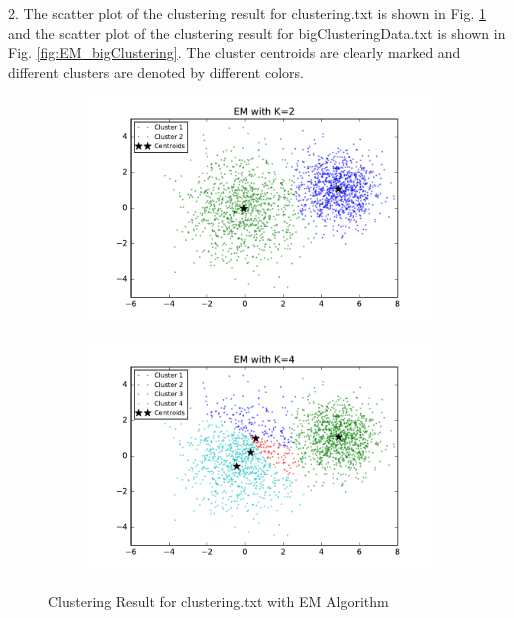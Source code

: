 \begin{description}
\begin{description}
\item{2.} The scatter plot of the clustering result for clustering.txt is shown in Fig. \ref{fig:EM_clustering} and the scatter plot of the clustering result for bigClusteringData.txt is shown in Fig. \ref{fig:EM_bigClustering}. The cluster centroids are clearly marked and different clusters are denoted by different colors. 

\begin{figure}[!h]
        \centering
        \begin{subfigure}[b]{0.475\textwidth}
            \centering
            \includegraphics[width=\textwidth]{./figures/clustering_EM_2.pdf}
        \end{subfigure}
        \hfill
        \begin{subfigure}[b]{0.475\textwidth}  
            \centering 
            \includegraphics[width=\textwidth]{./figures/clustering_EM_4.pdf}
        \end{subfigure}       
        \caption{Clustering Result for clustering.txt with EM Algorithm}
        \label{fig:EM_clustering}
\end{figure}


\end{description}
\end{description}

